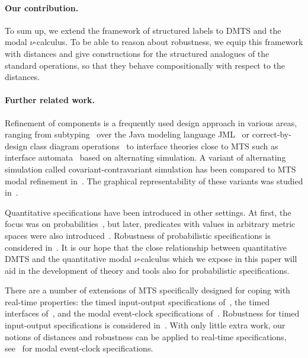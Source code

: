 \documentclass[twocolumn]{svjour3-dummy}
\begin{document}
\paragraph{Our contribution.}
To sum up, we extend the framework of structured labels to DMTS and
the modal $\nu$-calculus.  To be able to reason about robustness, we
equip this framework with distances and give constructions for the
structured analogues of the standard operations, so that they behave
compositionally with respect to the distances.

\paragraph{Further related work.}

Refinement of components is a frequently used design approach in various
areas, ranging from subtyping~\cite{DBLP:journals/toplas/LiskovW94} over
the Java modeling language JML~\cite{DBLP:conf/fase/JacobsP01} or
correct-by-design class diagram
operations~\cite{DBLP:conf/fase/FahrenbergALW14} to interface theories
close to MTS such as interface
automata~\cite{DBLP:conf/sigsoft/AlfaroH01} based on alternating
simulation. A variant of alternating simulation called
cova\-riant-contravariant simulation has been compared to MTS modal
refinement in~\cite{DBLP:journals/scp/AcetoFFIP13}. The graphical
representability of these variants was studied
in~\cite{DBLP:journals/tcs/BoudolL92, DBLP:conf/concur/BenesDFKL13}.

Quantitative specifications have been introduced in other settings.  At
first, the focus was on probabilities~\cite{DBLP:conf/lics/HuthK97, mu2,
  DBLP:conf/fossacs/Mio11}, but later, predicates with values in
arbitrary metric spaces were also
introduced~\cite{DBLP:journals/tse/AlfaroFS09}.  Robustness of
probabilistic specifications is considered
in~\cite{DBLP:journals/tcs/AlfaroFHMS05, DBLP:journals/tse/AlfaroFS09,
  DBLP:conf/concur/Alfaro03}.  It is our hope that the close
relationship between quantitative DMTS and the quantitative modal
$\nu$-calculus which we expose in this paper will aid in the development
of theory and tools also for probabilistic specifications.

There are a number of extensions of MTS specifically designed for
coping with real-time properties: the timed input-output
specifications of~\cite{DBLP:journals/sttt/DavidLLNTW15}, the timed
interfaces of~\cite{DBLP:conf/emsoft/AlfaroHS02}, and the modal
event-clock specifications of~\cite{DBLP:journals/scp/BertrandLPR12}.
Robustness for timed input-output specifications is considered
in~\cite{DBLP:journals/tcs/LarsenLTW14,
  DBLP:journals/corr/abs-1207-4269, DBLP:conf/formats/LarsenLTW11}.
With only little extra work, our notions of distances and robustness
can be applied to real-time specifications,
see~\cite{DBLP:journals/corr/abs-1207-4268} for modal event-clock
specifications.
\end{document}
